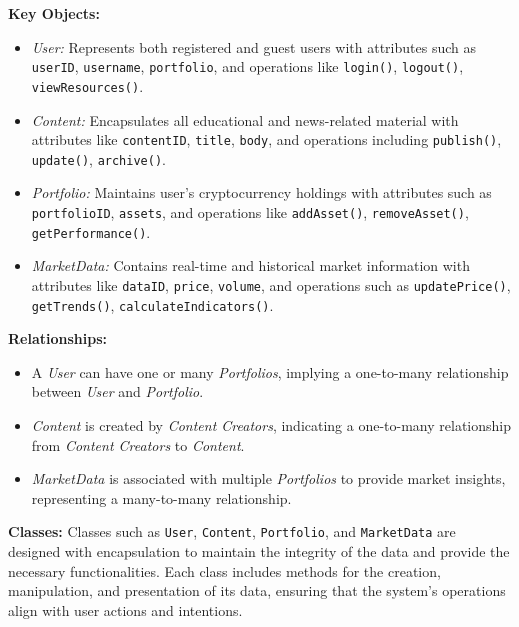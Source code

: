 \documentclass[12pt]{report}
\begin{document}
\textbf{Key Objects:}
\begin{itemize}
    \item \textit{User:} Represents both registered and guest users with attributes such as \texttt{userID}, \texttt{username}, \texttt{portfolio}, and operations like \texttt{login()}, \texttt{logout()}, \texttt{viewResources()}.
    \item \textit{Content:} Encapsulates all educational and news-related material with attributes like \texttt{contentID}, \texttt{title}, \texttt{body}, and operations including \texttt{publish()}, \texttt{update()}, \texttt{archive()}.
    \item \textit{Portfolio:} Maintains user's cryptocurrency holdings with attributes such as \texttt{portfolioID}, \texttt{assets}, and operations like \texttt{addAsset()}, \texttt{removeAsset()}, \texttt{getPerformance()}.
    \item \textit{MarketData:} Contains real-time and historical market information with attributes like \texttt{dataID}, \texttt{price}, \texttt{volume}, and operations such as \texttt{updatePrice()}, \texttt{getTrends()}, \texttt{calculateIndicators()}.
\end{itemize}

\textbf{Relationships:}
\begin{itemize}
    \item A \textit{User} can have one or many \textit{Portfolios}, implying a one-to-many relationship between \textit{User} and \textit{Portfolio}.
    \item \textit{Content} is created by \textit{Content Creators}, indicating a one-to-many relationship from \textit{Content Creators} to \textit{Content}.
    \item \textit{MarketData} is associated with multiple \textit{Portfolios} to provide market insights, representing a many-to-many relationship.
\end{itemize}

\textbf{Classes:}
Classes such as \texttt{User}, \texttt{Content}, \texttt{Portfolio}, and \texttt{MarketData} are designed with encapsulation to maintain the integrity of the data and provide the necessary functionalities. Each class includes methods for the creation, manipulation, and presentation of its data, ensuring that the system's operations align with user actions and intentions.
\end{document}
